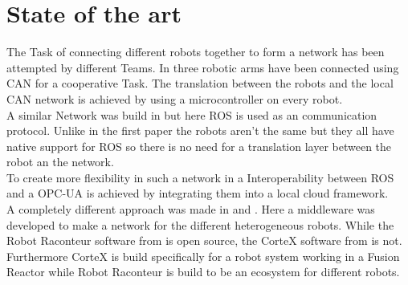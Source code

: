 \documentclass[conference]{IEEEtran}
\begin{document}
\section{State of the art}
The Task of connecting different robots together to form a network has been attempted by different Teams.
In \cite{SotaCAN} three robotic arms have been connected using CAN for a cooperative Task.
The translation between the robots and the local CAN network is achieved by using a microcontroller on every robot.\\
A similar Network was build in \cite{SotaROS} but here ROS is used as an communication protocol.
Unlike in the first paper the robots aren't the same but they all have native support for ROS so there is no need for a translation layer between the robot an the network.\\
To create more flexibility in such a network in \cite{StoaROStoOPCUA} a Interoperability between ROS and a OPC-UA is achieved by integrating them into a local cloud framework.\\
A completely different approach was made in \cite{SotaRaconteur} and \cite{SotaFusion}.
Here a middleware was developed to make a network for the different heterogeneous robots.
While the Robot Raconteur software from \cite{SotaRaconteur} is open source, the CorteX software from \cite{SotaFusion} is not.
Furthermore CorteX is build specifically for a robot system working in a Fusion Reactor while Robot Raconteur is build to be an ecosystem for different robots.

\end{document}
